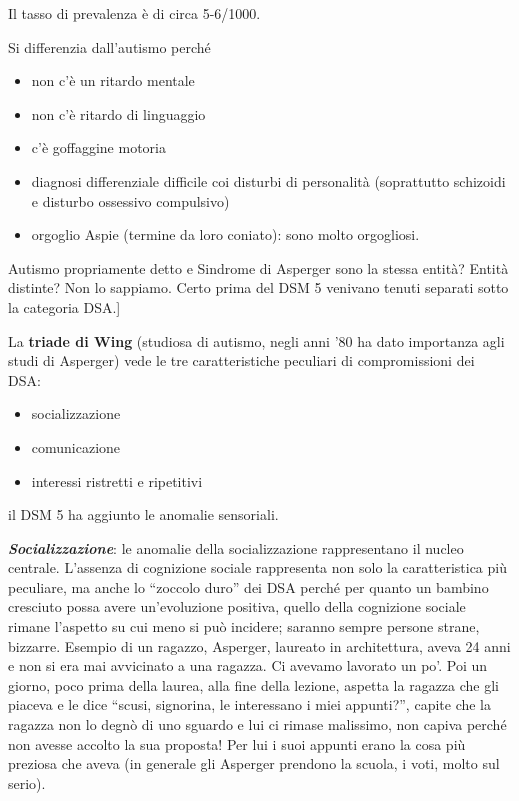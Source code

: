 Il tasso di prevalenza è di circa 5-6/1000.

Si differenzia dall'autismo perché

\begin{itemize}
\item
  non c'è un ritardo mentale
\item
  non c'è ritardo di linguaggio
\item
  c'è goffaggine motoria
\item
  diagnosi differenziale difficile coi disturbi di personalità
  (soprattutto schizoidi e disturbo ossessivo compulsivo)
\item
  orgoglio Aspie (termine da loro coniato): sono molto orgogliosi.
\end{itemize}

Autismo propriamente detto e Sindrome di Asperger sono la stessa entità?
Entità distinte? Non lo sappiamo. Certo prima del DSM 5 venivano tenuti
separati sotto la categoria DSA.{]}

La \textbf{triade di Wing} (studiosa di autismo, negli anni '80 ha dato
importanza agli studi di Asperger) vede le tre caratteristiche peculiari
di compromissioni dei DSA:

\begin{itemize}
\item
  socializzazione
\item
  comunicazione
\item
  interessi ristretti e ripetitivi
\end{itemize}

il DSM 5 ha aggiunto le anomalie sensoriali.

\emph{\textbf{Socializzazione}}: le anomalie della socializzazione
rappresentano il nucleo centrale. L'assenza di cognizione sociale
rappresenta non solo la caratteristica più peculiare, ma anche lo
``zoccolo duro'' dei DSA perché per quanto un bambino cresciuto possa
avere un'evoluzione positiva, quello della cognizione sociale rimane
l'aspetto su cui meno si può incidere; saranno sempre persone strane,
bizzarre. Esempio di un ragazzo, Asperger, laureato in architettura,
aveva 24 anni e non si era mai avvicinato a una ragazza. Ci avevamo
lavorato un po'. Poi un giorno, poco prima della laurea, alla fine della
lezione, aspetta la ragazza che gli piaceva e le dice ``scusi,
signorina, le interessano i miei appunti?'', capite che la ragazza non
lo degnò di uno sguardo e lui ci rimase malissimo, non capiva perché non
avesse accolto la sua proposta! Per lui i suoi appunti erano la cosa più
preziosa che aveva (in generale gli Asperger prendono la scuola, i voti,
molto sul serio).

